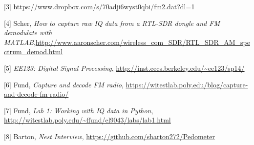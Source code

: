 \documentclass[12pt,fleqn]{article}\usepackage{../../common}
\begin{document}
[3] \url{https://www.dropbox.com/s/70adji6wyst0qbi/fm2.dat?dl=1}

[4] Scher, {\em How to capture raw IQ data from a RTL-SDR dongle and FM demodulate with MATLAB},\url{http://www.aaronscher.com/wireless_com_SDR/RTL_SDR_AM_spectrum_demod.html}

[5] {\em EE123: Digital Signal Processing}, \url{http://inst.eecs.berkeley.edu/~ee123/sp14/}

[6] Fund, {\em Capture and decode FM radio}, \url{https://witestlab.poly.edu/blog/capture-and-decode-fm-radio/}

[7] Fund, {\em Lab 1: Working with IQ data in Python}, \url{http://witestlab.poly.edu/~ffund/el9043/labs/lab1.html}

[8] Barton, {\em Nest Interview}, \url{https://github.com/sbarton272/Pedometer}
\end{document}
